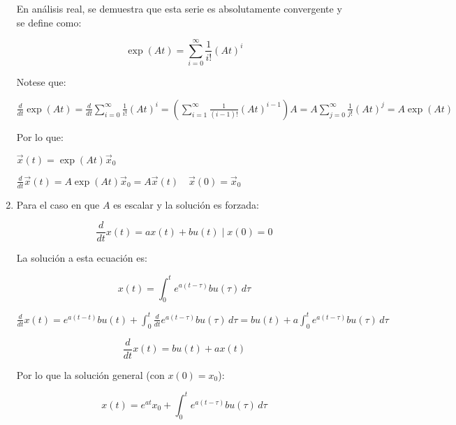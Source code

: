 \begin{enumerate}
En análisis real, se demuestra que esta serie es absolutamente convergente y se define como:

\begin{equation}
\exp{(At)} = \sum\limits_{i = 0}^{\infty} \frac{1}{i!} (A t)^i
\end{equation}

Notese que:

\begin{math}
\frac{d}{dt} \exp{(At)} = \frac{d}{dt} \sum\limits_{i=0}^{\infty} \frac{1}{i!} (At)^i = \left( \sum\limits_{i=1}^{\infty} \frac{1}{(i-1)!} (At)^{i-1} \right) A = A \sum\limits_{j=0}^{\infty} \frac{1}{j!} (At)^j = A \exp{(At)}
\end{math}

Por lo que:

\begin{math}
\vec{x}(t) = \exp{(At)} \vec{x}_0
\end{math}

\begin{math}
\frac{d}{dt} \vec{x}(t) = A \exp{(At)} \vec{x}_0 = A \vec{x}(t) \quad \vec{x}(0) = \vec{x}_0
\end{math}

\item
Para el caso en que $A$ es escalar y la solución es forzada:

\begin{equation}
\frac{d}{dt} x(t) = a x(t) + b u(t) \mid x(0) = 0
\end{equation}

La solución a esta ecuación es:

\begin{equation}
x(t) = \int_0^t e^{a(t-\tau)} b u(\tau) \, d \tau
\end{equation}

\begin{math}
\frac{d}{dt} x(t) = e^{a(t-t)} b u(t) + \int_0^t \frac{d}{dt} e^{a(t-\tau)} b u(\tau) \, d \tau = b u(t) + a \int_0^t e^{a(t-\tau)} b u(\tau) \, d \tau
\end{math}

\begin{equation}
\frac{d}{dt} x(t) = b u(t) + a x(t)
\end{equation}

Por lo que la solución general (con $x(0) = x_0$):

\begin{equation}
x(t) = e^{at} x_0 + \int_0^t e^{a(t-\tau)} b u(\tau) \, d \tau
\end{equation}


\end{enumerate}
